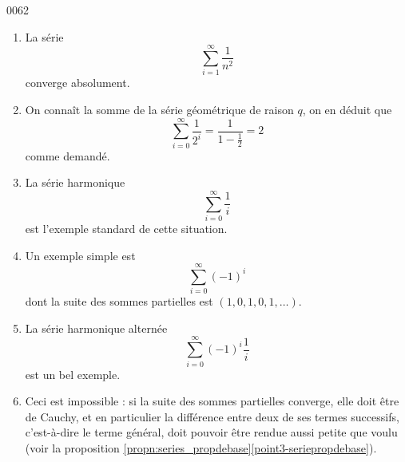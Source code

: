 
\begin{corrige}{0062}

\begin{enumerate}

\item
La série
\begin{equation*}
	\sum_{i=1}^\infty \frac{1}{n^2}
\end{equation*}
converge absolument.



\item
On connaît la somme de la série géométrique de raison $q$, on en
  déduit que
  \begin{equation*}
    \sum_{i=0}^\infty \frac1{2^i} = \frac1{1-\frac12} = 2
  \end{equation*}
  comme demandé.

\item
La série harmonique
  \begin{equation*}
    \sum_{i=0}^\infty \frac1i
  \end{equation*}
  est l'exemple standard de cette situation.

\item
Un exemple simple est
  \begin{equation*}
    \sum_{i=0}^\infty {(-1)^i}
  \end{equation*}
  dont la suite des sommes partielles est $(1, 0, 1, 0, 1, \ldots)$.

\item
La série harmonique alternée
  \begin{equation*}
    \sum_{i=0}^\infty {(-1)}^i\frac1i
  \end{equation*}
  est un bel exemple.

\item
Ceci est impossible : si la suite des sommes partielles
  converge, elle doit être de Cauchy, et en particulier la différence
  entre deux de ses termes successifs, c'est-à-dire le terme général,
  doit pouvoir être rendue aussi petite que voulu (voir la proposition
  \ref{propn:series_propdebase}\ref{point3-seriepropdebase}).
\end{enumerate}


\end{corrige}
